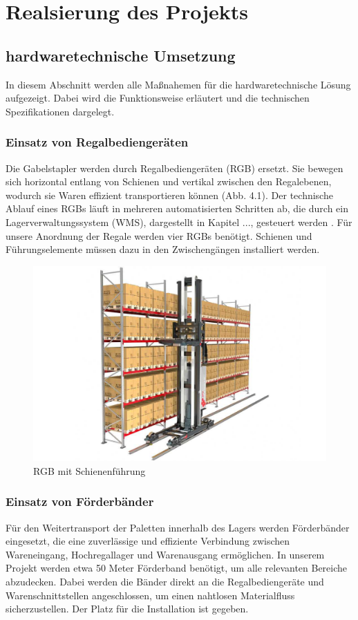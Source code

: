 \chapter{Realsierung des Projekts}

\section{hardwaretechnische Umsetzung}
In diesem Abschnitt werden alle Maßnahemen für die hardwaretechnische Lösung aufgezeigt. Dabei wird die Funktionsweise erläutert und die technischen Spezifikationen dargelegt.
\subsection{Einsatz von Regalbediengeräten}
Die Gabelstapler werden durch Regalbediengeräten (RGB) ersetzt. Sie bewegen sich horizontal entlang von Schienen und vertikal zwischen den Regalebenen, wodurch sie Waren effizient transportieren können (Abb. 4.1).
Der technische Ablauf eines RGBs läuft in mehreren automatisierten Schritten ab, die durch ein Lagerverwaltungssystem (WMS), dargestellt in Kapitel ..., gesteuert werden \autocites{martin_technische_2021}. Für unsere Anordnung der Regale werden vier RGBs benötigt. Schienen und Führungselemente müssen dazu in den Zwischengängen installiert werden.

\begin{figure}
	\centering
	\includegraphics[width=0.5\linewidth]{images/RGB}
	\caption{RGB mit Schienenführung}
	\label{fig:rgb}
\end{figure}


\subsection{Einsatz von Förderbänder}
Für den Weitertransport der Paletten innerhalb des Lagers werden Förderbänder eingesetzt, die eine zuverlässige und effiziente Verbindung zwischen Wareneingang, Hochregallager und Warenausgang ermöglichen. In unserem Projekt werden etwa 50 Meter Förderband benötigt, um alle relevanten Bereiche abzudecken. Dabei werden die Bänder direkt an die Regalbediengeräte und Warenschnittstellen angeschlossen, um einen nahtlosen Materialfluss sicherzustellen. Der Platz für die Installation ist gegeben.


